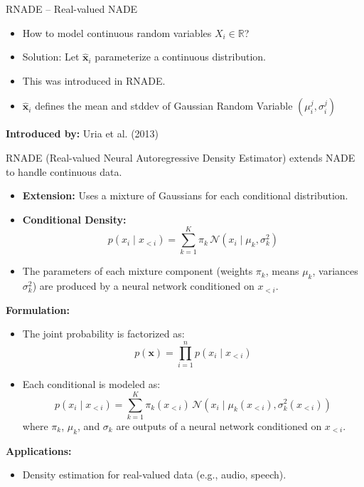 \begin{frame}[allowframebreaks]{RNADE – Real-valued NADE}
    \begin{itemize}
        \item How to model continuous random variables $X_i \in \mathbb{R}$?
        \item Solution: Let $\mathbf{\hat{x}}_i$ parameterize a continuous distribution.
        \item This was introduced in RNADE.
        \item $\mathbf{\hat{x}}_i$ defines the mean and stddev of Gaussian Random Variable $(\mu^j_i, \sigma^j_i)$
    \end{itemize}

    \framebreak

    \textbf{Introduced by:} Uria et al. (2013)

    \vspace{1em}
    RNADE (Real-valued Neural Autoregressive Density Estimator) extends NADE to handle continuous data.

    \begin{itemize}
        \item \textbf{Extension:} Uses a mixture of Gaussians for each conditional distribution.
        \item \textbf{Conditional Density:}
        \[
            p(x_i \mid x_{<i}) = \sum_{k=1}^K \pi_k \, \mathcal{N}(x_i \mid \mu_k, \sigma_k^2)
        \]
        \item The parameters of each mixture component (weights $\pi_k$, means $\mu_k$, variances $\sigma_k^2$) are produced by a neural network conditioned on $x_{<i}$.
    \end{itemize}

    \framebreak
    \textbf{Formulation:}
    \begin{itemize}
        \item The joint probability is factorized as:
        \[
            p(\mathbf{x}) = \prod_{i=1}^n p(x_i \mid x_{<i})
        \]
        \item Each conditional is modeled as:
        \[
            p(x_i \mid x_{<i}) = \sum_{k=1}^K \pi_k(x_{<i}) \, \mathcal{N}(x_i \mid \mu_k(x_{<i}), \sigma_k^2(x_{<i}))
        \]
        where $\pi_k$, $\mu_k$, and $\sigma_k$ are outputs of a neural network conditioned on $x_{<i}$.
    \end{itemize}

    \textbf{Applications:}
    \begin{itemize}
        \item Density estimation for real-valued data (e.g., audio, speech).
    \end{itemize}
    

\end{frame}

